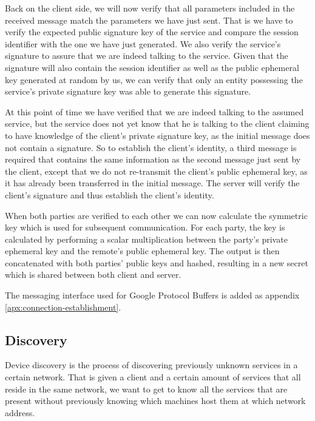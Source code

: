 Back on the client side, we will now verify that all parameters included in the received message match the parameters we have just sent.
That is we have to verify the expected public signature key of the service and compare the session identifier with the one we have just generated.
We also verify the service's signature to assure that we are indeed talking to the service.
Given that the signature will also contain the session identifier as well as the public ephemeral key generated at random by us, we can verify that only an entity possessing the service's private signature key was able to generate this signature.

At this point of time we have verified that we are indeed talking to the assumed service, but the service does not yet know that he is talking to the client claiming to have knowledge of the client's private signature key, as the initial message does not contain a signature.
So to establish the client's identity, a third message is required that contains the same information as the second message just sent by the client, except that we do not re-transmit the client's public ephemeral key, as it has already been transferred in the initial message.
The server will verify the client's signature and thus establish the client's identity.

When both parties are verified to each other we can now calculate the symmetric key which is used for subsequent communication.
For each party, the key is calculated by performing a scalar multiplication between the party's private ephemeral key and the remote's public ephemeral key.
The output is then concatenated with both parties' public keys and hashed, resulting in a new secret which is shared between both client and server.

The messaging interface used for Google Protocol Buffers is added as appendix \ref{apx:connection-establishment}.

\subsection{Discovery}
\label{sec:discovery}

Device discovery is the process of discovering previously unknown services in a certain network.
That is given a client and a certain amount of services that all reside in the same network, we want to get to know all the services that are present without previously knowing which machines host them at which network address.


